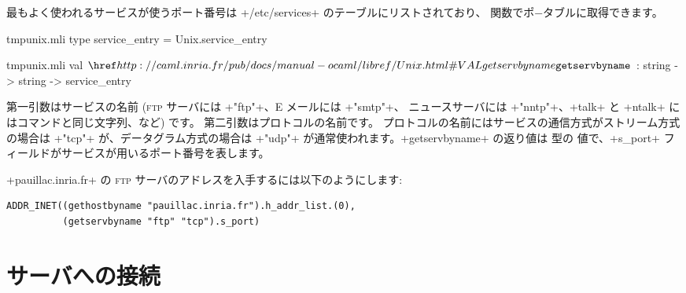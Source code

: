 最もよく使われるサービスが使うポート番号は \ml+/etc/services+ のテーブルにリストされており、
 関数でポ−タブルに取得できます。
%
\begin{codefile}{tmpunix.mli}
type service_entry = Unix.service_entry
\end{codefile}
%
\begin{listingcodefile}{tmpunix.mli}
val $\libvalue{Unix}{getservbyname}$ : string -> string -> service_entry
\end{listingcodefile}
%
第一引数はサービスの名前 (\textsc{ftp} サーバには \ml+"ftp"+、E メールには \ml+"smtp"+、
ニュースサーバには \ml+"nntp"+、\ml+talk+ と \ml+ntalk+ にはコマンドと同じ文字列、など) です。
第二引数はプロトコルの名前です。
プロトコルの名前にはサービスの通信方式がストリーム方式の場合は \ml+"tcp"+ が、データグラム方式の場合は
\ml+"udp"+ が通常使われます。\ml+getservbyname+ の返り値は  型の
値で、\ml+s_port+ フィールドがサービスが用いるポート番号を表します。


\begin{example} %
\ml+pauillac.inria.fr+ の \textsc{ftp} サーバのアドレスを入手するには以下のようにします:
%
\begin{lstlisting}
ADDR_INET((gethostbyname "pauillac.inria.fr").h_addr_list.(0),
          (getservbyname "ftp" "tcp").s_port)
\end{lstlisting}
\end{example}


\section{サーバへの接続}

